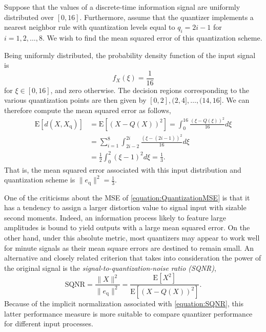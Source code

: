 \begin{example} \label{example:UniformQuantizer}
Suppose that the values of a discrete-time information signal are uniformly distributed over $[0,16]$.
Furthermore, assume that the quantizer implements a nearest neighbor rule with quantization levels equal to $q_i = 2i - 1$ for $i = 1, 2, \ldots, 8$.
We wish to find the mean squared error of this quantization scheme.

Being uniformly distributed, the probability density function of the input signal is
\begin{equation*}
f_X (\xi) = \frac{1}{16}
\end{equation*}
for $\xi \in [0, 16]$, and zero otherwise.
The decision regions corresponding to the various quantization points are then given by $[0, 2], (2, 4], \ldots, (14, 16]$.
We can therefore compute the mean squared error as follows,
\begin{equation*}
\begin{split}
\mathrm{E} [ d(X, X_{\mathrm{q}}) ]
&= \mathrm{E} \left[ (X - Q(X))^2 \right]
= \int_0^{16} \frac{(\xi - Q(\xi))^2}{16} d\xi \\
&= \sum_{i=1}^8 \int_{2i-2}^{2i} \frac{(\xi - (2i - 1))^2}{16} d\xi \\
&= \frac{1}{2} \int_{0}^{2} (\xi - 1)^2 d\xi = \frac{1}{3} .
\end{split}
\end{equation*}
That is, the mean squared error associated with this input distribution and quantization scheme is $\| e_{\mathrm{q}} \|^2 = \frac{1}{3}$.
\end{example}

One of the criticisms about the MSE of \eqref{equation:QuantizationMSE} is that it has a tendency to assign a larger distortion value to signal input with sizable second moments.
Indeed, an information process likely to feature large amplitudes is bound to yield outputs with a large mean squared error.
On the other hand, under this absolute metric, most quantizers may appear to work well for minute signals as their mean square errors are destined to remain small.
An alternative and closely related criterion that takes into consideration the power of the original signal is the \emph{signal-to-quantization-noise ratio (SQNR)},
\begin{equation} \label{equation:SQNR}
\text{SQNR} = \frac{\| X \|^2}{\| e_{\mathrm{q}} \|^2}
= \frac{\mathrm{E} \left[ X^2 \right]}{\mathrm{E} \left[ (X - Q(X))^2 \right]} .
\end{equation}
Because of the implicit normalization associated with \eqref{equation:SQNR}, this latter performance measure is more suitable to compare quantizer performance for different input processes.

